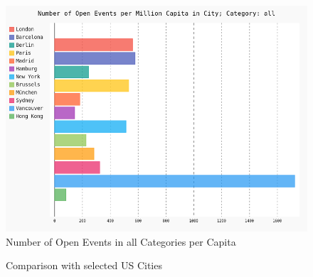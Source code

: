 \begin{figure}[!b]
	\includegraphics[width=1\linewidth]{../plotting/pngs/activities_per_city_per_capita/all.png}
	\caption{Number of Open Events in all Categories per Capita}\label{fig:categories_all_percapita}	
\end{figure}

\begin{figure}[!htp]
	\hfill
	\caption{Comparison with selected US Cities}\label{fig:usabar}
\end{figure}